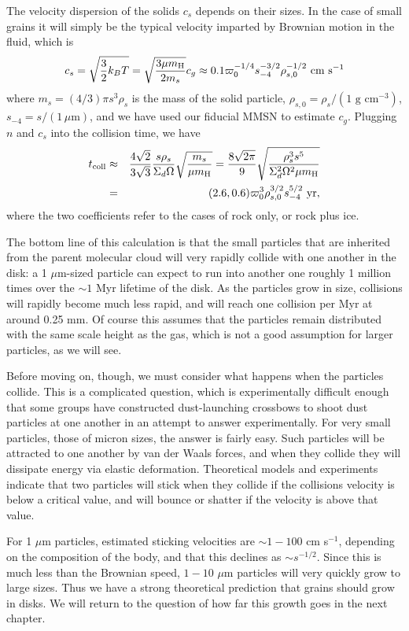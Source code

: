 The velocity dispersion of the solids $c_s$ depends on their sizes. In the case of small grains it will simply be the typical velocity imparted by Brownian motion in the fluid, which is
\begin{equation}
c_s = \sqrt{\frac{3}{2} k_B T} = \sqrt{\frac{3 \mu m_{\rm H}}{2 m_s}} c_g \approx 0.1 \varpi_0^{-1/4} s_{-4}^{-3/2} \rho_{s,0}^{-1/2}\mbox{ cm s}^{-1}
\end{equation}
where $m_s = (4/3)\pi s^3 \rho_s$ is the mass of the solid particle, $\rho_{s,0}=\rho_s/(1\mbox{ g cm}^{-3})$, $s_{-4} = s/(1\,\mu\mbox{m})$, and we have used our fiducial MMSN to estimate $c_g$. Plugging $n$ and $c_s$ into the collision time, we have
\begin{eqnarray}
t_{\rm coll} & \approx & \frac{4\sqrt{2}}{3\sqrt{3}}\frac{s\rho_s}{\Sigma_d \Omega}\sqrt{\frac{m_s}{\mu m_{\rm H}}} = \frac{8\sqrt{2\pi}}{9} \sqrt{\frac{\rho_s^3 s^5}{\Sigma_d^2\Omega^2 \mu m_{\rm H}}}
\nonumber \\
& = & (2.6, 0.6) \varpi_0^3 \rho_{s,0}^{3/2} s_{-4}^{5/2}\mbox{ yr},
\end{eqnarray}
where the two coefficients refer to the cases of rock only, or rock plus ice.

The bottom line of this calculation is that the small particles that are inherited from the parent molecular cloud will very rapidly collide with one another in the disk: a 1 $\mu$m-sized particle can expect to run into another one roughly 1 million times over the $\sim 1$ Myr lifetime of the disk. As the particles grow in size, collisions will rapidly become much less rapid, and will reach one collision per Myr at around 0.25 mm. Of course this assumes that the particles remain distributed with the same scale height as the gas, which is not a good assumption for larger particles, as we will see.

Before moving on, though, we must consider what happens when the particles collide. This is a complicated question, which is experimentally difficult enough that some groups have constructed dust-launching crossbows to shoot dust particles at one another in an attempt to answer experimentally. For very small particles, those of micron sizes, the answer is fairly easy. Such particles will be attracted to one another by van der Waals forces, and when they collide they will dissipate energy via elastic deformation. Theoretical models and experiments indicate that two particles will stick when they collide if the collisions velocity is below a critical value, and will bounce or shatter if the velocity is above that value.

For 1 $\mu$m particles, estimated sticking velocities are $\sim 1-100$ cm s$^{-1}$, depending on the composition of the body, and that this declines as $\sim s^{-1/2}$. Since this is much less than the Brownian speed, $1-10$ $\mu$m particles will very quickly grow to large sizes. Thus we have a strong theoretical prediction that grains should grow in disks. We will return to the question of how far this growth goes in the next chapter.


